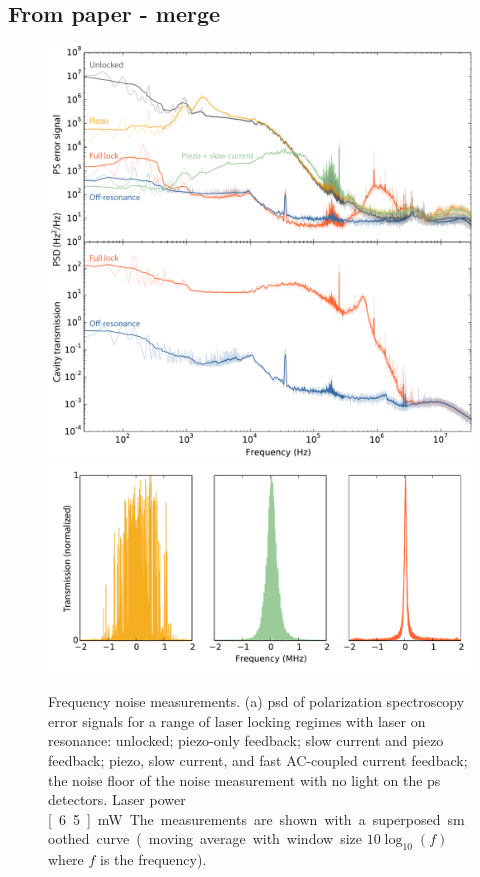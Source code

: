 \subsection{From paper - merge}
\begin{figure}[htbp]
\centering
    \includegraphics[width=0.9\linewidth]{part1/Figs/fig4a_v3.pdf}
    \label{fig:PSDs}
    \includegraphics[width=0.9\linewidth]{part1/Figs/fig4b_v1.pdf}
    \label{fig:cavity_scans}
\caption{Frequency noise measurements.
(a) \Gls*{psd} of polarization spectroscopy error signals for a range of laser locking regimes with laser on resonance: unlocked; piezo-only feedback; slow current and piezo feedback; piezo, slow current, and fast AC-coupled current feedback; the noise floor of the noise measurement with no light on the \gls*{ps} detectors.
Laser power \unit[6.5]{mW}.
The measurements are shown with a superposed smoothed curve (moving average  with window size $10\log_{10}(f)$ where $f$ is the frequency).
}
\end{figure}
